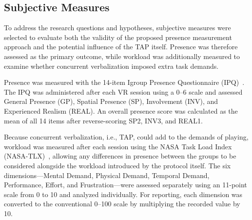 



\subsection{Subjective Measures}
\label{subsec:measures}

To address the research questions and hypotheses, subjective measures were selected to evaluate both the validity of the proposed presence measurement approach and the potential influence of the TAP itself. Presence was therefore assessed as the primary outcome, while workload was additionally measured to examine whether concurrent verbalization imposed extra task demands.


Presence was measured with the 14-item Igroup Presence Questionnaire (IPQ)~\cite{schubert2001experience}.
The IPQ was administered after each VR session using a 0--6 scale and assessed General Presence (GP), Spatial Presence (SP), Involvement (INV), and Experienced Realism (REAL).
An overall presence score was calculated as the mean of all 14 items after reverse-scoring SP2, INV3, and REAL1.



Because concurrent verbalization, i.e., TAP, could add to the demands of playing, workload was measured after each session using the NASA Task Load Index (NASA-TLX)~\cite{hart1988development,hart2006nasa}, allowing any differences in presence between the groups to be considered alongside the workload introduced by the protocol itself. The six dimensions—Mental Demand, Physical Demand, Temporal Demand, Performance, Effort, and Frustration—were assessed separately using an 11-point scale from 0 to 10 and analyzed individually.
For reporting, each dimension was converted to the conventional 0--100 scale by multiplying the recorded value by 10. 


